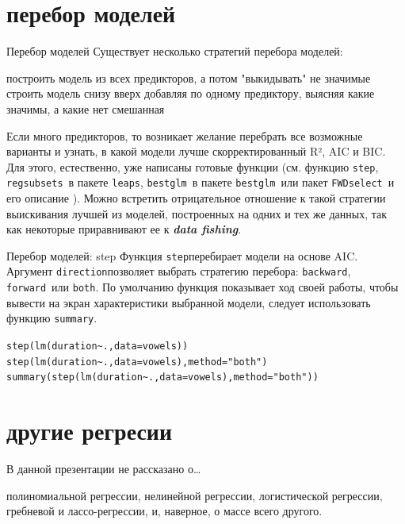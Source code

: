 \section{перебор моделей}
\begin{frame}{Перебор моделей}
Существует несколько стратегий перебора моделей:
\begin{itemize}
\mytem построить модель из всех предикторов, а потом "выкидывать" не значимые
\mytem строить модель снизу вверх добавляя по одному предиктору, выясняя какие значимы, а какие нет
\mytem смешанная
\end{itemize}
\vfill
Если много предикторов, то возникает желание перебрать все возможные варианты и узнать, в какой модели лучше скорректированный R², AIC и BIC. Для этого, естественно, уже написаны готовые функции (см. функцию \scriptsize\verb"step"\normalsize, \scriptsize\verb"regsubsets"\normalsize\ в пакете \scriptsize\verb"leaps"\normalsize, \scriptsize\verb"bestglm"\normalsize\ в пакете \scriptsize\verb"bestglm"\normalsize\ или пакет \scriptsize\verb"FWDselect"\normalsize\  и его описание \citep{sestelo2016}). Можно встретить отрицательное отношение к такой стратегии выискивания лучшей из моделей, построенных на одних и тех же данных, так как некоторые приравнивают ее к \textbf{\textit{data fishing}}.
\end{frame}
\begin{frame}{Перебор моделей: step}
Функция \scriptsize\verb"step"\normalsize перебирает модели на основе AIC. Аргумент \scriptsize\verb"direction"\normalsize позволяет выбрать стратегию перебора: \scriptsize\verb"backward"\normalsize, \scriptsize\verb"forward"\normalsize\ или \scriptsize\verb"both"\normalsize. По умолчанию функция показывает ход своей работы, чтобы вывести на экран характеристики выбранной модели, следует использовать функцию \scriptsize\verb"summary"\normalsize.
\vfill
\scriptsize
\begin{alltt}
step(lm(duration\textasciitilde., data = vowels))\\
step(lm(duration\textasciitilde., data = vowels), method = "both")\\
summary(step(lm(duration\textasciitilde., data = vowels), method = "both"))
\end{alltt}
\normalsize

\end{frame}

\section{другие регресии}
\begin{frame}{В данной презентации не рассказано о…}
\begin{itemize}
\mytem полиномиальной регрессии,
\mytem нелинейной регрессии,
\mytem логистической регрессии,
\mytem гребневой и лассо-регрессии,
\mytem и, наверное, о массе всего другого.
\end{itemize}
\end{frame}
